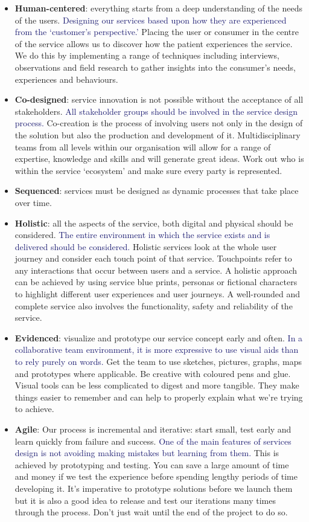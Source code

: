 \documentclass[10pt,a4paper]{article}
\begin{document}
\begin{itemize}
	\item \textbf{Human-centered}: everything starts from a deep understanding of the needs of the users. \textcolor{MidnightBlue}{Designing our services based upon how they are experienced from the ‘customer’s perspective.’} Placing the user or consumer in the centre of the service allows us to discover how the patient experiences the service. We do this by implementing a range of techniques including interviews, observations and field research to gather insights into the consumer’s needs, experiences and behaviours.
	\item \textbf{Co-designed}: service innovation is not possible without the acceptance of all stakeholders. \textcolor{MidnightBlue}{All stakeholder groups should be involved in the service design process.} Co-creation is the process of involving users not only in the design of the solution but also the production and development of it. Multidisciplinary teams from all levels within our organisation will allow for a range of expertise, knowledge and skills and will generate great ideas. Work out who is within the service ‘ecosystem’ and make sure every party is represented.
	\item \textbf{Sequenced}: services must be designed as dynamic processes that take place over time. 
	\item \textbf{Holistic}: all the aspects of the service, both digital and physical should be considered. \textcolor{MidnightBlue}{The entire environment in which the service exists and is delivered should be considered.} Holistic services look at the whole user journey and consider each touch point of that service. Touchpoints refer to any interactions that occur between users and a service. A holistic approach can be achieved by using service blue prints, personas or fictional characters to highlight different user experiences and user journeys. A well-rounded and complete service also involves the functionality, safety and reliability of the service.
	\item \textbf{Evidenced}: visualize and prototype our service concept early and often. \textcolor{MidnightBlue}{In a collaborative team environment, it is more expressive to use visual aids than to rely purely on words. }Get the team to use sketches, pictures, graphs, maps and prototypes where applicable. Be creative with coloured pens and glue. Visual tools can be less complicated to digest and more tangible. They make things easier to remember and can help to properly explain what we’re trying to achieve.
	\item \textbf{Agile}: Our process is incremental and iterative: start small, test early and learn quickly from failure and success. \textcolor{MidnightBlue}{One of the main features of services design is not avoiding making mistakes but learning from them.} This is achieved by prototyping and testing. You can save a large amount of time and money if we test the experience before spending lengthy periods of time developing it. It’s imperative to prototype solutions before we launch them but it is also a good idea to release and test our iterations many times through the process. Don’t just wait until the end of the project to do so.
\end{itemize}
\end{document}
